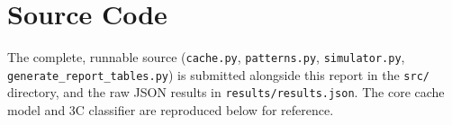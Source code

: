 \documentclass[11pt]{article}
\begin{document}
\appendix
\section{Source Code}

The complete, runnable source (\texttt{cache.py}, \texttt{patterns.py},
\texttt{simulator.py}, \texttt{generate\_report\_tables.py}) is
submitted alongside this report in the \texttt{src/} directory, and the
raw JSON results in \texttt{results/results.json}. The core cache
model and 3C classifier are reproduced below for reference.


\end{document}
